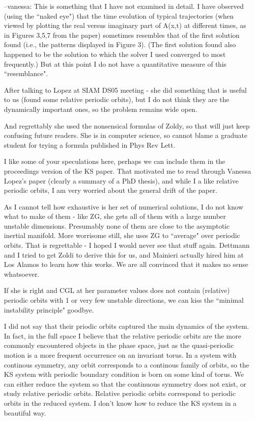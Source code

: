 --vanessa:
This is something that I have not examined in detail.  I have observed (using
the ``naked eye") that the time evolution of typical trajectories (when viewed
by plotting the real versus imaginary part of A(x,t) at different times, as in
Figures 3,5,7 from the paper) sometimes resembles that of the first solution
found (i.e., the patterns displayed in Figure 3). (The first solution
found also happened to be the solution to which the solver I used
converged to most frequently.)  But at this point I do not have a
quantitative measure of this ``resemblance".

After talking to Lopez at SIAM DS05 meeting - she did something that
is useful to us (found some relative periodic orbits), but I do not think
they are the dynamically important ones, so the problem remains wide open.

And regrettably she used the nonsensical formulas of Zoldy, so that will
just keep confusing future readers. 
She is in computer science, so cannot
blame a graduate student for trying a formula published in Phys Rev Lett.

I like some of your speculations here, perhaps we can include them in the
proceedings version of the KS paper. That motivated me to read through
Vanessa Lopez's paper (clearly a summary of a PhD thesis), and while I
a like relative periodic orbits, I am very worried about the general drift
of the paper.

As I cannot tell how exhaustive is her set of numerical solutions, I do
not know what to make of them - like ZG, she gets all of them with a large
number unstable dimensions. Presumably none of them are close to the
asymptotic inertial manifold. More worrisome still, she uses ZG to
``average" over periodic orbits. That is regrettable - I hoped I would
never see that stuff again. Dettmann and I tried to get Zoldi to
derive this for us, and Mainieri actually hired him at Los Alamos to learn
how this works. We are all convinced that it makes no sense whatsoever.

If she is right and CGL at her parameter values does not contain
(relative) periodic orbits with 1 or very few unstable directions, we can
kiss the ``minimal instability principle" goodbye.

I did not say that their
priodic orbits captured the main dynamics of the system. In fact, in the full
space I believe that the relative periodic orbits are the more commonly
encountered objects in the phase space, just as the quasi-periodic motion is a
more frequent occurrence on an invariant torus. In a system with continous
symmetry, any orbit corresponds to a continous family of orbits, so the KS
system with periodic boundary condition is born on some kind of torus. We can
either reduce the system so that the continuous symmetry does not exist, or
study relative periodic orbits. Relative periodic orbits correspond to periodic
orbits in the reduced system. I don't know how to reduce the KS system in a
beautiful way.


